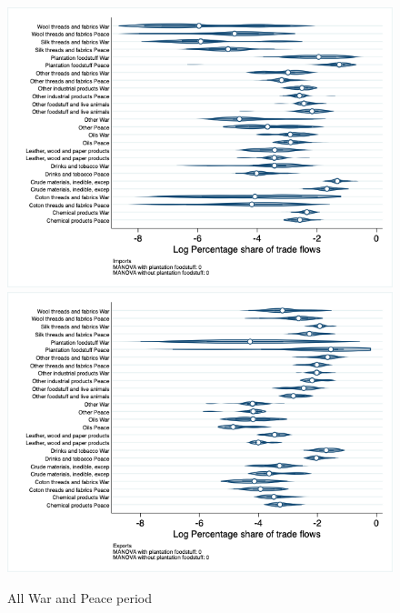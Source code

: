\documentclass[12pt,a4paper,notitlepage,english]{article}
\begin{document}
\begin{figure}
\caption{All War and Peace period}
\label{peace_war_nat_distr}
\includegraphics[scale=.4]{peace_war_nat_distr_Isitc}
\includegraphics[scale=.4]{peace_war_nat_distr_Xsitc}
\end{figure}
\end{document}
